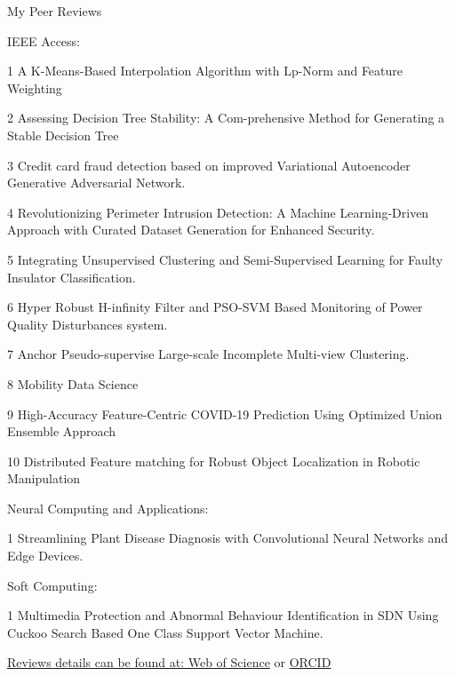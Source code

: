 \documentclass{resume} %
\begin{document}
\begin{rSection}{My Peer Reviews}
	
	\begin{rSubsection}{IEEE Access:}{}{}{}	
		\item[1] A K-Means-Based Interpolation Algorithm with Lp-Norm and Feature Weighting
		\item[2] Assessing Decision Tree Stability: A Com-prehensive Method for Generating a Stable Decision Tree
		\item[3] Credit card fraud detection based on improved Variational Autoencoder Generative Adversarial Network.
		\item[4] Revolutionizing Perimeter Intrusion Detection: A Machine Learning-Driven Approach with Curated Dataset Generation for Enhanced Security.
		\item[5] Integrating Unsupervised Clustering and Semi-Supervised
		Learning for Faulty Insulator Classification.
		\item[6] Hyper Robust H-infinity Filter and PSO-SVM Based Monitoring of Power Quality Disturbances system.
		\item[7] Anchor Pseudo-supervise Large-scale Incomplete Multi-view Clustering.
		\item[8] Mobility Data Science
		\item[9] High-Accuracy Feature-Centric COVID-19 Prediction Using Optimized Union Ensemble Approach
		\item[10] Distributed Feature matching for Robust Object Localization in Robotic Manipulation
	\end{rSubsection}
	\begin{rSubsection}{Neural Computing and Applications:}{}{}{}		
		\item[1] Streamlining Plant Disease Diagnosis with Convolutional Neural Networks and Edge	Devices.
	\end{rSubsection}
	\begin{rSubsection}{Soft Computing:}{}{}{}		
		\item[1] Multimedia Protection and Abnormal Behaviour Identification in SDN Using Cuckoo Search Based One Class Support Vector Machine.
	\end{rSubsection}
	 \href{https://www.webofscience.com/wos/author/record/IUN-0908-2023}{Reviews details can be found at: Web of Science} or \href{https://orcid.org/0000-0001-8482-7678}{ ORCID}
\end{rSection}
\end{document}
